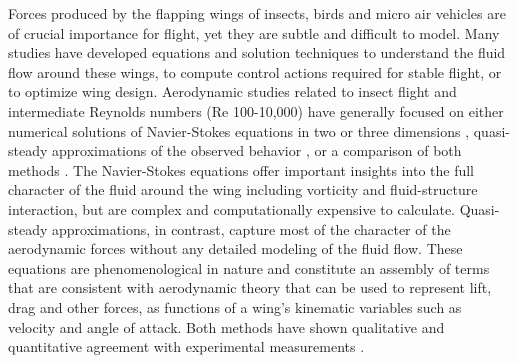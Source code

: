 \documentclass{article}
\begin{document}

Forces produced by the flapping wings of insects, birds and micro air vehicles
are of crucial importance for flight, yet they are subtle and difficult to
model.  Many studies have developed equations and solution techniques to
understand the fluid flow around these wings, to compute control actions
required for stable flight, or to optimize wing design. Aerodynamic studies
related to insect flight and intermediate Reynolds numbers (Re 100-10,000) have
generally focused on either numerical solutions of Navier-Stokes equations in
two or three dimensions \cite{wu2004unsteady,wang2000two}, quasi-steady
approximations of the observed behavior
\cite{sane2002aerodynamic,ellington1984aerodynamics}, or a comparison of both
methods \cite{pesavento2004falling}.  The Navier-Stokes equations offer
important insights into the full character of the fluid around the wing
including vorticity and fluid-structure interaction, but are complex and
computationally expensive to calculate.  Quasi-steady approximations, in
contrast, capture most of the character of the aerodynamic forces without any
detailed modeling of the fluid flow.  These equations are phenomenological in
nature and constitute an assembly of terms that are consistent with aerodynamic
theory that can be used to represent lift, drag and other forces, as functions
of a wing's kinematic variables such as velocity and angle of attack.  Both
methods have shown qualitative and quantitative agreement with experimental
measurements \cite{wang2004unsteady}.

\end{document}
